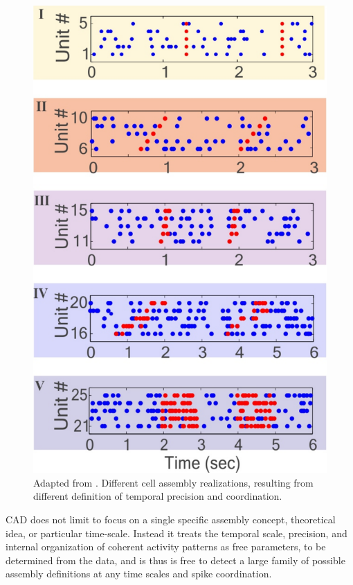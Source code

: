 \begin{figure}
    \centering
    \includegraphics[scale=0.3]{figures/CellAssembliesZoom.pdf}
    \caption{Adapted from \cite{RussoDurstewitz}. Different cell assembly realizations, resulting from different definition of temporal precision and coordination.}
    \label{fig:CellAsseDet}
\end{figure}
CAD does not limit to focus on a single specific assembly concept, theoretical idea, or particular time-scale. Instead it treats the temporal scale, precision, and internal organization of coherent activity patterns as free parameters, to be determined from the data, and is thus is free to detect a large family of possible assembly definitions at any time scales and spike coordination.\\
